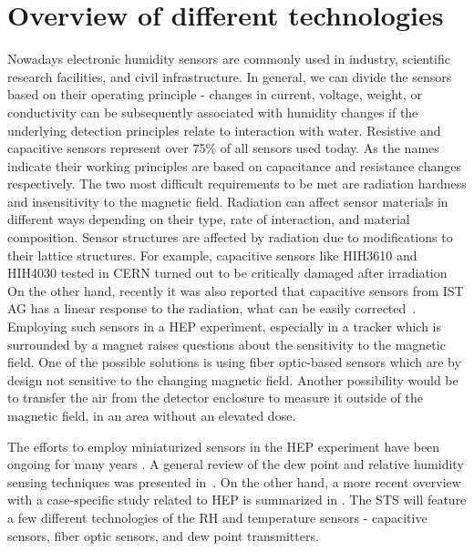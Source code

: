 \section{Overview of different technologies}

Nowadays electronic humidity sensors are commonly used in industry, scientific research facilities, and civil infrastructure. In general, we can divide the sensors based on their operating principle - changes in current, voltage, weight, or conductivity can be subsequently associated with humidity changes if the underlying detection principles relate to interaction with water. Resistive and capacitive sensors represent over 75\% of all sensors used today. As the names indicate their working principles are based on capacitance and resistance changes respectively. The two most difficult requirements to be met are radiation hardness and insensitivity to the magnetic field. Radiation can affect sensor materials in different ways depending on their type, rate of interaction, and material composition. Sensor structures are affected by radiation due to modifications to their lattice structures. For example, capacitive sensors like HIH3610 and HIH4030 tested in CERN turned out to be critically damaged after irradiation~\cite{Berruti} On the other hand, recently it was also reported that capacitive sensors from IST AG has a linear response to the radiation, what can be easily corrected~\cite{Kapic_sensor}. Employing such sensors in a \gls{HEP} experiment, especially in a tracker which is surrounded by a magnet raises questions about the sensitivity to the magnetic field. One of the possible solutions is using fiber optic-based sensors which are by design not sensitive to the changing magnetic field. Another possibility would be to transfer the air from the detector enclosure to measure it outside of the magnetic field, in an area without an elevated dose. 

The efforts to employ miniaturized sensors in the \gls{HEP} experiment have been ongoing for many years \cite{Berruti}. A general review of the dew point and relative humidity sensing techniques was presented in~\cite{RITTERSMA}. On the other hand, a more recent overview with a case-specific study related to \gls{HEP} is summarized in \cite{Kapic}. The \gls{STS} will feature a few different technologies of the \gls{RH} and temperature sensors - capacitive sensors, fiber optic sensors, and dew point transmitters. 


